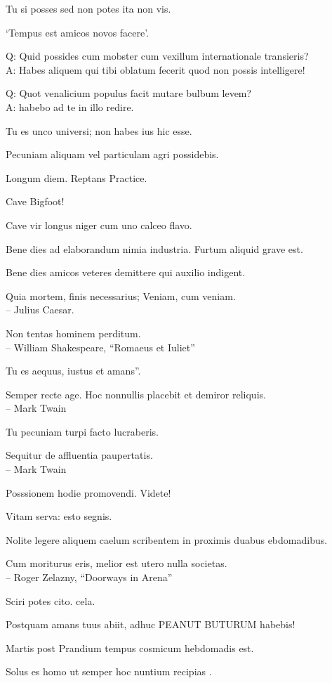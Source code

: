 \documentclass[titlepage,12pt]{memoir}
\begin{document}
Tu si posses sed non potes ita non vis.

‘Tempus est amicos novos facere’.

Q: Quid possides cum mobster cum vexillum internationale transieris?\\
A: Habes aliquem qui tibi oblatum fecerit quod non possis intelligere!

Q: Quot venalicium populus facit mutare bulbum levem?\\
A: habebo ad te in illo redire.

Tu es unco universi; non habes ius hic esse.

 Pecuniam aliquam vel particulam agri possidebis.

Longum diem. Reptans Practice.

Cave Bigfoot!

Cave vir longus niger cum uno calceo flavo.

Bene dies ad elaborandum nimia industria. Furtum aliquid grave est.

Bene dies amicos veteres demittere qui auxilio indigent.

Quia mortem, finis necessarius;
Veniam, cum veniam.
\\-- Julius Caesar.

Non tentas hominem perditum.
\\-- William Shakespeare, “Romaeus et Iuliet”

Tu es aequus, iustus et amans”.

Semper recte age. Hoc nonnullis placebit et demiror reliquis.
\\-- Mark Twain

Tu pecuniam turpi facto lucraberis.

Sequitur de affluentia paupertatis.
\\-- Mark Twain

Posssionem hodie promovendi. Videte!

Vitam serva: esto segnis.

Nolite legere aliquem caelum scribentem in proximis duabus ebdomadibus.

Cum moriturus eris, melior est utero nulla societas.
\\-- Roger Zelazny, “Doorways in Arena”

Sciri potes cito. cela.

Postquam amans tuus abiit, adhuc PEANUT BUTURUM habebis!

Martis post Prandium tempus cosmicum hebdomadis est.

 Solus es homo ut semper hoc nuntium recipias .
\end{document}
